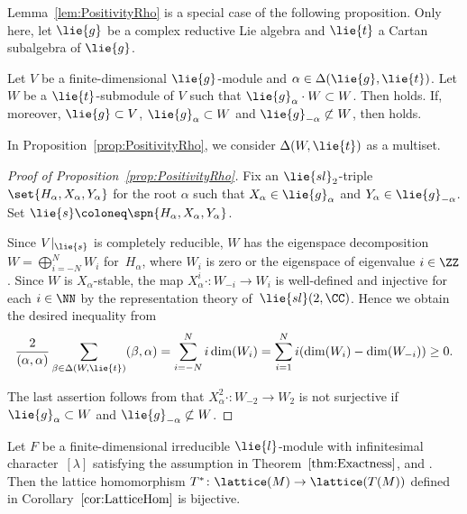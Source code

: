 Lemma~\ref{lem:PositivityRho} is a special case of the following proposition.
Only here, let $\lie{g}$ be a complex reductive Lie algebra and $\lie{t}$ a Cartan subalgebra of $\lie{g}$.

\begin{Proposition}\label{prop:PositivityRho}
	Let $V$ be a finite-dimensional $\lie{g}$-module and $\alpha \in \Delta(\lie{g}, \lie{t})$.
	Let $W$ be a $\lie{t}$-submodule of $V$ such that $\lie{g}_{\alpha} \cdot W \subset W$.
	Then  holds.
	If, moreover, $\lie{g}\subset V$, $\lie{g}_{\alpha} \subset W$ and $\lie{g}_{-\alpha} \not\subset W$,
	then  holds.
\end{Proposition}

\begin{Remark}
	In Proposition~\ref{prop:PositivityRho}, we consider $\Delta(W, \lie{t})$ as a multiset.
\end{Remark}
	
\begin{proof}[Proof of Proposition~\ref{prop:PositivityRho}]
	Fix an $\lie{sl}_2$-triple $\set{H_\alpha, X_\alpha, Y_\alpha}$ for the root $\alpha$ such that $X_\alpha \in \lie{g}_{\alpha}$ and $Y_\alpha \in \lie{g}_{-\alpha}$.
	Set $\lie{s}\coloneq \spn{H_\alpha, X_\alpha, Y_\alpha}$.

	Since $V|_{\lie{s}}$ is completely reducible, $W$ has the eigenspace decomposition
	$W = \bigoplus_{i = -N}^N W_i$ for~$H_\alpha$, where $W_i$ is zero or the eigenspace of eigenvalue $i \in \ZZ$.
	Since $W$ is $X_\alpha$-stable, the map $X_\alpha^i\cdot \colon W_{-i} \rightarrow W_{i}$
	is well-defined and injective for each $i \in \NN$ by the representation theory of~$\lie{sl}(2,\CC)$.
	Hence we obtain the desired inequality from
	\begin{align*}
		\frac{2}{(\alpha, \alpha)} \sum_{\beta \in \Delta(W, \lie{t})} (\beta, \alpha) = \sum_{i=-N}^N i\dim(W_i)
	 = \sum_{i=1}^N i(\dim(W_i) - \dim(W_{-i})) \geq 0.
	\end{align*}
	
	The last assertion follows from that $X_\alpha^2\cdot \colon W_{-2} \rightarrow W_{2}$ is not surjective
	if $\lie{g}_{\alpha} \subset W$ and $\lie{g}_{-\alpha} \not\subset W$.
\end{proof}

\begin{Theorem}\label{thm:ReductionToScalar}
	Let $F$ be a finite-dimensional irreducible $\lie{l}$-module with infinitesimal character~$[\lambda]$ satisfying the assumption in Theorem~$\ref{thm:Exactness}$,
	and .
	Then the lattice homomorphism $T^*\colon \lattice(M) \rightarrow \lattice(T(M))$ defined in Corollary~$\ref{cor:LatticeHom}$ is bijective.
\end{Theorem}

